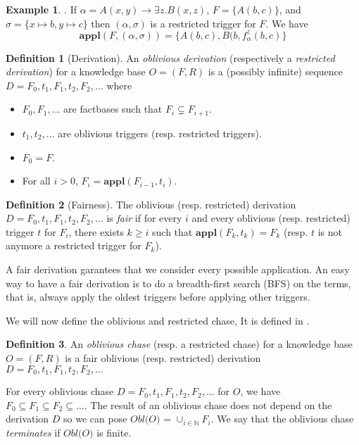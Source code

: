 \documentclass{article}
\theoremstyle{definition}
\newtheorem{definition}{Definition}[section]
\newtheorem{example}{Example}[section]
\theoremstyle{remark}
\def \N {\mathbb N}
\newcommand{\Appl}{\textbf{appl}}
\begin{document}
\begin{example}. If $\alpha = A(x,y) \rightarrow \exists z.B(x,z)$, $F = \{A(b,c)\}$, and $\sigma = \{x \mapsto b, y \mapsto c \}$ then $(\alpha,\sigma)$ is a restricted trigger for $F$. We have $$\Appl(F,(\alpha,\sigma)) = \{A(b,c),B(b,f_{\alpha}^z(b,c)\}$$
\end{example}

\begin{definition}[Derivation]
An \emph{oblivious derivation} (respectively a \emph{restricted derivation}) for a knowledge base $O= (F,R)$ is a (possibly infinite) sequence $D=F_0,t_1,F_1,t_2,F_2,\ldots$ where 
\begin{itemize}
\item $F_0,F_1,\ldots$ are factbases such that $F_i \subsetneq F_{i+1}$.
\item $t_1,t_2,\ldots$ are oblivious triggers (resp. restricted triggers).
\item $F_0 = F$.
\item For all $i > 0$, $F_{i}= \Appl(F_{i-1},t_i)$.
\end{itemize}
\end{definition}


\begin{definition}[Fairness]
The oblivious (resp. restricted) derivation $D=F_0,t_1,F_1,t_2,F_2,\ldots$ is \emph{fair} if for every $i$ and every oblivious (resp. restricted) trigger $t$ for $F_i$, there exists $k \geq i$ such that $\Appl(F_{k},t_k) = F_k$ (resp. $t$ is not anymore a restricted trigger for $F_k$).
\end{definition}

A fair derivation garantees that we consider every possible application. An easy way to have a fair derivation is to do a breadth-first search (BFS) on the terms, that is, always apply the oldest triggers before applying other triggers.

We will now define the oblivious and restricted chase, It is defined in \cite{obl_res}.


\begin{definition}
An \emph{oblivious chase} (resp. a restricted chase) for a knowledge base $O= (F,R)$ is a fair oblivious (resp. restricted) derivation $D=F_0,t_1,F_1,t_2,F_2,\ldots$ 
\end{definition}

For every oblivious chase $D = F_0,t_1,F_1,t_2,F_2,\ldots$ for $O$, we have $F_0 \subseteq F_1 \subseteq F_2 \subseteq \ldots$. The result of an oblivious chase does not depend on the derivation $D$ so we can pose \emph{$\textit{Obl(O)}$} = $\cup_{i \in \N}F_i$. We say that the oblivious chase \emph{terminates} if $\textit{Obl(O)}$ is finite.
\end{document}
